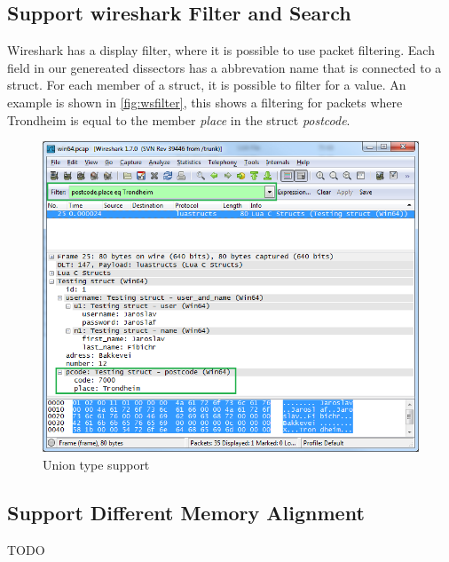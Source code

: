 



\subsection{Support \Gls{wireshark} Filter and Search}
Wireshark has a display filter, where it is possible to use packet filtering. 
Each field in our genereated dissectors has a abbrevation name that is 
connected to a struct. For each member of a struct, it is possible to filter 
for a value. An example is shown in \autoref{fig:wsfilter}, this shows a 
filtering for packets where Trondheim is equal to the member \emph{place} in 
the struct \emph{postcode}. 

\begin{figure}[ht]
	\center
	\includegraphics[width=\textwidth]{./sprints/img/wireshark_filter}
	\caption{Union type support\label{fig:wsfilter}}
\end{figure}

\subsection{Support Different Memory Alignment}
TODO

